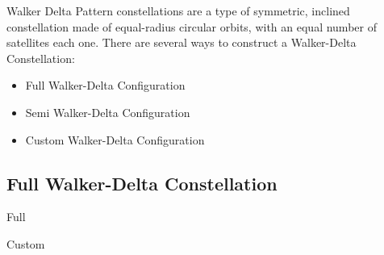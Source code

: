 
Walker Delta Pattern constellations are a type of symmetric, inclined constellation made of equal-radius circular orbits, with an equal number of satellites each one.
There are several ways to construct a Walker-Delta Constellation:

\begin{itemize}
\item Full Walker-Delta Configuration
\item Semi Walker-Delta Configuration
\item Custom Walker-Delta Configuration
\end{itemize}

\subsection{Full Walker-Delta Constellation}
{Full}



{Custom}


